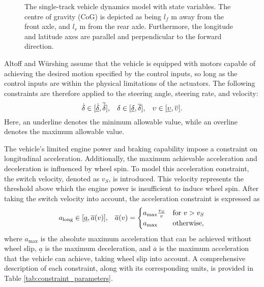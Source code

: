 

\begin{figure}[htb!]
    \centering
    
    \caption[The single track vehicle dynamics model]{The single-track vehicle dynamics model with state variables. The centre of gravity (CoG) is depicted as being $l_f$ m away from the front axle, and $l_r$ m from the rear axle. Furthermore, the longitude and latitude axes are parallel and perpendicular to the forward direction.}
    \label{fig:vehicle_dynamics_model}
\end{figure}


Altoff and  W\"{u}rshing \cite{Althoff2020} assume that the vehicle is equipped with motors capable of achieving the desired motion specified by the control inputs, so long as the control inputs are within the physical limitations of the actuators.
The following constraints are therefore applied to the steering angle, steering rate, and velocity:
\begin{equation}
\dot{\delta} \in [\underline{\dot{\delta}}, \overline{\dot{\delta}}], \hspace{0.3cm} 
\delta \in [\underline{\delta}, \overline{\delta}], \hspace{0.3cm} 
\upsilon \in [\underline{\upsilon}, \overline{\upsilon}].
\label{eq:control_constraints}
\end{equation}
Here, an underline denotes the minimum allowable value, while an overline denotes the maximum allowable value.

The vehicle's limited engine power and braking capability impose a constraint on longitudinal acceleration. 
Additionally, the maximum achievable acceleration and deceleration is influenced by wheel spin. 
To model this acceleration constraint, the switch velocity, denoted as $v_S$, is introduced. 
This velocity represents the threshold above which the engine power is insufficient to induce wheel spin. 
After taking the switch velocity into account, the acceleration constraint is expressed as
\begin{equation}
    a_{\text{long}} \in [\underline{a}, \overline{a}(v)], \hspace{0.3cm} 
    \overline{a}(v) = 
    \begin{cases}
        a_{\text{max}} \frac{v_{S}}{v} & \text{for } v > v_{S} \\
        a_{\text{max}} & \text{otherwise},
    \end{cases}
\label{eq:accl_constraint}
\end{equation}
where $a_{\text{max}}$ is the absolute maximum acceleration that can be achieved without wheel slip, $\underline{a}$ is the maximum deceleration, and $\overline{a}$ is the maximum acceleration that the vehicle can achieve, taking wheel slip into account.
A comprehensive description of each constraint, along with its corresponding units, is provided in Table \ref{tab:constraint_parameters}.


